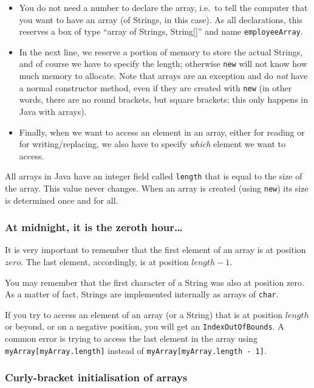 \begin{itemize}
\item You do not need a number to declare the array, i.e.~to tell the
  computer that you want to have an array (of Strings, in this
  case). As all declarations, this reserves a box of type ``array of
  Strings, String[]'' and name \verb+employeeArray+.
\item In the next line, we reserve a portion of memory to store the
  actual Strings, and of course we have to specify the length;
  otherwise \verb+new+ will not know how much memory to allocate. Note
  that arrays are an exception and do \emph{not} have a normal
  constructor method, even if they are created with \verb+new+ (in
  other words, there are no round brackets, but square brackets; this
  only happens in Java with arrays). 
\item Finally, when we want to access an element in an array, either
  for reading or for writing/replacing, we also have to specify
  \emph{which} element we want to access.
\end{itemize}

All arrays in Java have an integer field called \verb+length+ that is equal to
the size of the array. This value never changes. When an array is
created (using \verb+new+) its size is determined once and for all. 

\subsubsection{At midnight, it is the zeroth hour\ldots}
\label{sec:at-midnight-it}

It is very important to remember that the first element of an array is
at position $zero$. The last element, accordingly, is at position 
$length - 1$. 

You may remember that the first character of a String was also at
position zero. As a matter of fact, Strings are implemented internally
as arrays of \verb+char+. 

If you try to access an element of an array (or a String) that is at
position $length$ or beyond, or on a negative position, you will get
an \verb+IndexOutOfBounds+. A common error is trying to
access the last element in the array using
\verb+myArray[myArray.length]+ instead 
of \verb+myArray[myArray.length - 1]+.

\subsubsection*{Curly-bracket initialisation of arrays}
\label{sec:curly-brack-init}

